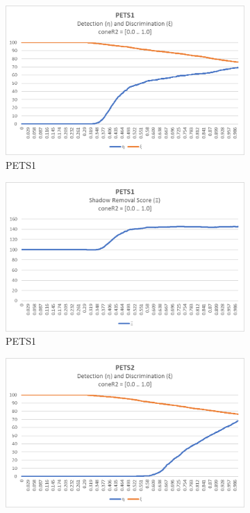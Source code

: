 \begin{appendices}
\begin{figure}
  \begin{subfigure}{.45\linewidth}
  \includegraphics[width=1\linewidth]{figures/appendix/pets1_coneR2_response.jpg}
  \caption{PETS1}
\end{subfigure}
\hfill
\begin{subfigure}{.45\linewidth}
  \includegraphics[width=1\linewidth]{figures/appendix/pets1_coneR2_score.jpg}
  \caption{PETS1}
\end{subfigure}
\hfill
\begin{subfigure}{.45\linewidth}
  \includegraphics[width=1\linewidth]{figures/appendix/pets2_coneR2_response.jpg}

\end{subfigure}
\end{figure}
\end{appendices}
